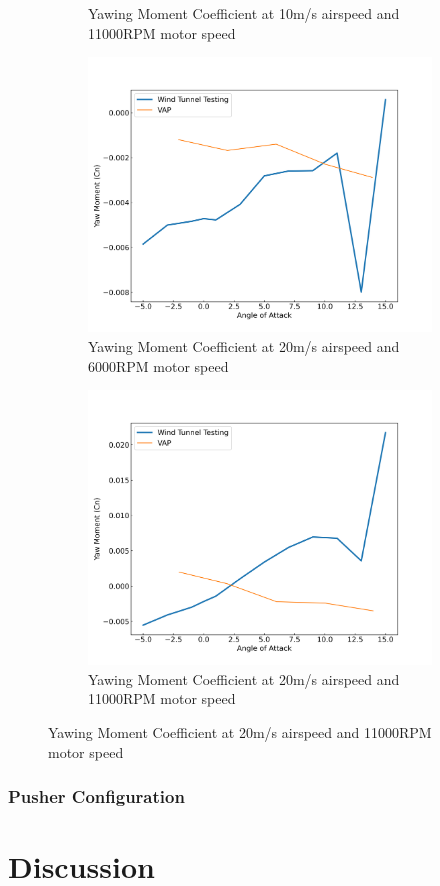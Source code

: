 \begin{figure}[H]
\begin{subfigure}[b]{0.467\textwidth}
        \caption{Yawing Moment Coefficient at 10m/s airspeed and 11000RPM motor speed}
        \label{fig:Missing3}
    \end{subfigure}
    \begin{subfigure}[b]{0.467\textwidth}
        \centering
        \includegraphics[width=\textwidth]{05_Results/VAP/tractor/Cn/20ms_6000RPM_Cn.png}
        \caption{Yawing Moment Coefficient at 20m/s airspeed and 6000RPM motor speed}
        \label{fig:VAP_Cn_20ms_6000}
    \end{subfigure}
    \begin{subfigure}[b]{0.467\textwidth}
        \centering
        \includegraphics[width=\textwidth]{05_Results/VAP/tractor/Cn/20ms_11000RPM_Cn.png}
        \caption{Yawing Moment Coefficient at 20m/s airspeed and 11000RPM motor speed}
        \label{fig:VAP_Cn_20ms_11000}
    \end{subfigure}
\end{figure}


\subsubsection{Pusher Configuration}




\section{Discussion}